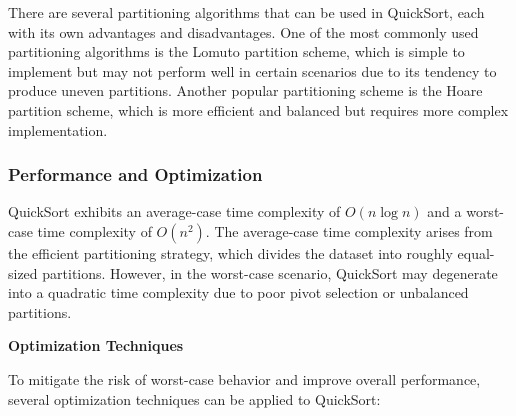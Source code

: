\documentclass[12pt]{book} %
\begin{document}
There are several partitioning algorithms that can be used in QuickSort, each with its own advantages and disadvantages. One of the most commonly used partitioning algorithms is the Lomuto partition scheme, which is simple to implement but may not perform well in certain scenarios due to its tendency to produce uneven partitions. Another popular partitioning scheme is the Hoare partition scheme, which is more efficient and balanced but requires more complex implementation.


\subsubsection{Performance and Optimization}
QuickSort exhibits an average-case time complexity of \(O(n \log n)\) and a worst-case time complexity of \(O(n^2)\). The average-case time complexity arises from the efficient partitioning strategy, which divides the dataset into roughly equal-sized partitions. However, in the worst-case scenario, QuickSort may degenerate into a quadratic time complexity due to poor pivot selection or unbalanced partitions.

\textbf{Optimization Techniques}

To mitigate the risk of worst-case behavior and improve overall performance, several optimization techniques can be applied to QuickSort:
\end{document}
